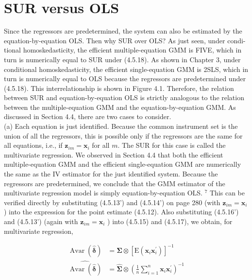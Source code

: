 \documentclass[10pt]{article}
\begin{document}
\section*{SUR versus OLS}
Since the regressors are predetermined, the system can also be estimated by the equation-by-equation OLS. Then why SUR over OLS? As just seen, under condi-\\
tional homoskedasticity, the efficient multiple-equation GMM is FIVE, which in turn is numerically equal to SUR under (4.5.18). As shown in Chapter 3, under conditional homoskedasticity, the efficient single-equation GMM is 2SLS, which in turn is numerically equal to OLS because the regressors are predetermined under (4.5.18). This interrelationship is shown in Figure 4.1. Therefore, the relation between SUR and equation-by-equation OLS is strictly analogous to the relation between the multiple-equation GMM and the equation-by-equation GMM. As discussed in Section 4.4, there are two cases to consider.\\
(a) Each equation is just identified. Because the common instrument set is the union of all the regressors, this is possible only if the regressors are the same for all equations, i.e., if $\mathbf{z}_{i m}=\mathbf{x}_{i}$ for all $m$. The SUR for this case is called the multivariate regression. We observed in Section 4.4 that both the efficient multiple-equation GMM and the efficient single-equation GMM are numerically the same as the IV estimator for the just identified system. Because the regressors are predetermined, we conclude that the GMM estimator of the multivariate regression model is simply equation-by-equation OLS. ${ }^{7}$ This can be verified directly by substituting (4.5.13') and (4.5.14') on page 280 (with $\mathbf{z}_{i m}=\mathbf{x}_{i}$ ) into the expression for the point estimate (4.5.12). Also substituting (4.5.16') and (4.5.13') (again with $\mathbf{z}_{i m}=\mathbf{x}_{i}$ ) into (4.5.15) and (4.5.17), we obtain, for multivariate regression,


\begin{align*}
\operatorname{Avar}(\hat{\boldsymbol{\delta}}) & =\mathbf{\Sigma} \otimes\left[\mathrm{E}\left(\mathbf{x}_{i} \mathbf{x}_{i}^{\prime}\right)\right]^{-1}  \tag{4.5.22}\\
\widehat{\operatorname{Avar}(\hat{\boldsymbol{\delta}})} & =\widehat{\mathbf{\Sigma}} \otimes\left(\frac{1}{n} \sum_{i=1}^{n} \mathbf{x}_{i} \mathbf{x}_{i}^{\prime}\right)^{-1} \tag{4.5.23}
\end{align*}
\end{document}
